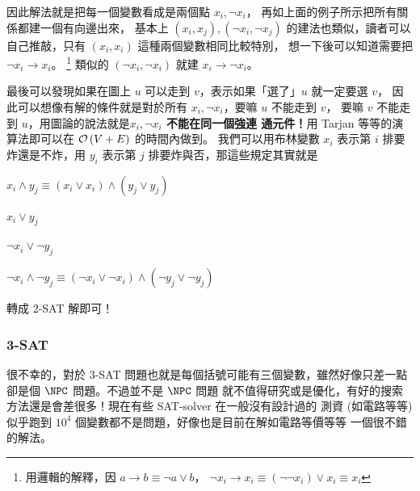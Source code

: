 \documentclass[a4paper,12pt]{book}
\begin{document}
因此解法就是把每一個變數看成是兩個點 $x_i, \lnot x_i$，
再如上面的例子所示把所有關係都建一個有向邊出來，
基本上 $(x_i, x_j), (\lnot x_i, \lnot x_j)$
的建法也類似，讀者可以自己推敲，只有 $(x_i, x_i)$ 這種兩個變數相同比較特別，
想一下後可以知道需要把 $\lnot x_i \to x_i$。
\footnote{用邏輯的解釋，因 $a \to b \equiv \lnot a \lor b$，
  $\lnot x_i \to x_i \equiv (\lnot \lnot x_i) \lor x_i \equiv x_i$
}
類似的 $(\lnot x_i, \lnot x_i)$ 就建 $x_i \to \lnot x_i$。

\begin{figure}[H]
  \centering
  
\end{figure}

最後可以發現如果在圖上 $u$ 可以走到 $v$，表示如果「選了」$u$ 就一定要選 $v$，
因此可以想像有解的條件就是對於所有 $x_i, \lnot x_i$，要嘛 $u$ 不能走到 $v$，
要嘛 $v$ 不能走到 $u$，用圖論的說法就是{\bf $x_i, \lnot x_i$ 不能在同一個強連
  通元件！}用 Tarjan 等等的演算法即可以在 $\operatorname{\mathcal{O}}\left(V+E\right)$ 的時間內做到。
%
我們可以用布林變數 $x_i$ 表示第 $i$ 排要炸還是不炸，用 $y_i$ 表示第
$j$ 排要炸與否，那這些規定其實就是
  \begin{description}[leftmargin=!, labelwidth=\widthof{一一一一}]
    \item[敵方要塞] $x_i \land y_j \equiv (x_i \lor x_i) \land (y_j \lor y_j)$
    \item[敵方軍團] $x_i \lor y_j$
    \item[住宅區] $\lnot x_i \lor \lnot y_j$
    \item[醫院] $\lnot x_i \land \lnot y_j \equiv 
      (\lnot x_i \lor \lnot x_i) \land (\lnot y_j \lor \lnot y_j)$
  \end{description}
  轉成 2-SAT 解即可！

\subsubsection{3-SAT}
很不幸的，對於 3-SAT 問題也就是每個括號可能有三個變數，雖然好像只差一點
卻是個 $\NPC$ 問題。不過並不是 $\NPC$ 問題
就不值得研究或是優化，有好的搜索方法還是會差很多！現在有些 SAT-solver 在一般沒有設計過的
測資 (如電路等等) 似乎跑到 $10^4$ 個變數都不是問題，好像也是目前在解如電路等價等等
一個很不錯的解法。
\end{document}
